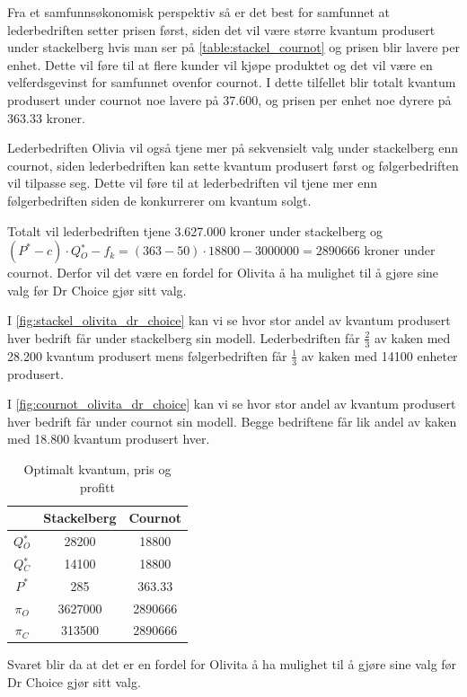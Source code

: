 \documentclass[
  12pt,
  a4paper,
  DIV=11,
  numbers=noendperiod]{scrartcl}
\begin{document}
Fra et samfunnsøkonomisk perspektiv så er det best for samfunnet at
lederbedriften setter prisen først, siden det vil være større kvantum
produsert under stackelberg hvis man ser på
\autoref{table:stackel_cournot} og prisen blir lavere per enhet. Dette
vil føre til at flere kunder vil kjøpe produktet og det vil være en
velferdsgevinst for samfunnet ovenfor cournot. I dette tilfellet blir
totalt kvantum produsert under cournot noe lavere på 37.600, og prisen
per enhet noe dyrere på 363.33 kroner.

Lederbedriften Olivia vil også tjene mer på sekvensielt valg under
stackelberg enn cournot, siden lederbedriften kan sette kvantum
produsert først og følgerbedriften vil tilpasse seg. Dette vil føre til
at lederbedriften vil tjene mer enn følgerbedriften siden de konkurrerer
om kvantum solgt.

Totalt vil lederbedriften tjene 3.627.000 kroner under stackelberg og
\((P^* -c) \cdot Q{_O^*} -f_k =(363 -50) \cdot18800 - 3000000 = 2890666\)
kroner under cournot. Derfor vil det være en fordel for Olivita å ha
mulighet til å gjøre sine valg før Dr Choice gjør sitt valg.

I \autoref{fig:stackel_olivita_dr_choice} kan vi se hvor stor andel av
kvantum produsert hver bedrift får under stackelberg sin modell.
Lederbedriften får \(\frac{2}{3}\) av kaken med 28.200 kvantum produsert
mens følgerbedriften får \(\frac{1}{3}\) av kaken med 14100 enheter
produsert.

I \autoref{fig:cournot_olivita_dr_choice} kan vi se hvor stor andel av
kvantum produsert hver bedrift får under cournot sin modell. Begge
bedriftene får lik andel av kaken med 18.800 kvantum produsert hver.

\begin{table}
\centering
\begin{tabular}{|c|c|c|}
\hline
 & Stackelberg & Cournot \\ \hline
$Q{_O^*}$ & 28200 & 18800 \\ \hline
$Q{_C^*}$ & 14100 & 18800 \\ \hline
$P^*$ & 285 & 363.33 \\ \hline
$\pi_O$ & 3627000 & 2890666 \\ \hline
$\pi_C$ & 313500 & 2890666 \\ \hline
\end{tabular}
\caption{Optimalt kvantum, pris og profitt}
\label{table:stackel_cournot}
\end{table}

Svaret blir da at det er en fordel for Olivita å ha mulighet til å gjøre
sine valg før Dr Choice gjør sitt valg.
\end{document}
